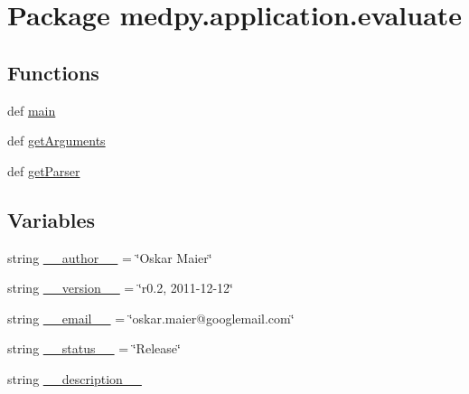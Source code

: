 \hypertarget{namespacemedpy_1_1application_1_1evaluate}{
\section{Package medpy.application.evaluate}
\label{namespacemedpy_1_1application_1_1evaluate}
}
\subsection*{Functions}
\begin{DoxyCompactItemize}
\item 
def \hyperlink{namespacemedpy_1_1application_1_1evaluate_a89f5e13eb49fe075ede6f31c1735a6c3}{main}
\item 
def \hyperlink{namespacemedpy_1_1application_1_1evaluate_a88f64ea30f0a759ce6aaff5a088e7bc5}{getArguments}
\item 
def \hyperlink{namespacemedpy_1_1application_1_1evaluate_a6d1612cf704d3b6fcdb9d846f3b19257}{getParser}
\end{DoxyCompactItemize}
\subsection*{Variables}
\begin{DoxyCompactItemize}
\item 
string \hyperlink{namespacemedpy_1_1application_1_1evaluate_aa59acc24b7bdfef4901f1cffefd8fa75}{\_\-\_\-author\_\-\_\-} = \char`\"{}Oskar Maier\char`\"{}
\item 
string \hyperlink{namespacemedpy_1_1application_1_1evaluate_a3fc765e9b0abd4638062745314be044b}{\_\-\_\-version\_\-\_\-} = \char`\"{}r0.2, 2011-\/12-\/12\char`\"{}
\item 
string \hyperlink{namespacemedpy_1_1application_1_1evaluate_aa69048efa7ef78658a9e17beafa72c38}{\_\-\_\-email\_\-\_\-} = \char`\"{}oskar.maier@googlemail.com\char`\"{}
\item 
string \hyperlink{namespacemedpy_1_1application_1_1evaluate_ac95b6fe7d344d64e9db37627786007b4}{\_\-\_\-status\_\-\_\-} = \char`\"{}Release\char`\"{}
\item 
string \hyperlink{namespacemedpy_1_1application_1_1evaluate_a35ca6226db281f3fb2df3e3cde77f6d4}{\_\-\_\-description\_\-\_\-}
\end{DoxyCompactItemize}


